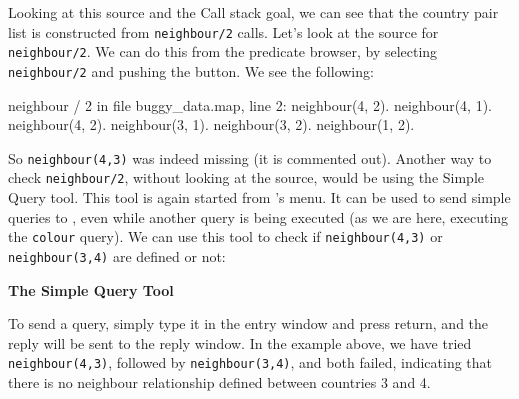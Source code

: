 Looking at this source and the Call stack goal, we can see that the country
pair list is constructed from \verb'neighbour/2' calls. Let's look at the
source for \verb'neighbour/2'. We can do this from the predicate browser, by
selecting \verb'neighbour/2' and pushing the  button. We see
the following:

\begin{code}
neighbour / 2 in file buggy_data.map, line 2:
neighbour(4, 2).
neighbour(4, 1).
neighbour(4, 2).
neighbour(3, 1).
neighbour(3, 2).
neighbour(1, 2).
\end{code}


So \verb'neighbour(4,3)' was indeed missing (it is commented out).
Another way to check \verb'neighbour/2', without looking at the source,
would be using the
Simple Query tool. This tool is again started from {\tkeclipse}'s
 menu. It can be used to send simple queries to {\eclipse},
even while another query is being executed (as we are here, executing the
\verb'colour' query). We can use this tool to check if \verb'neighbour(4,3)'
or \verb'neighbour(3,4)' are defined or not:

\begin{center}

\vspace{3mm}
{\bf The Simple Query Tool}
\end{center}

To send a query, simply type it in the entry window and press return, and
the reply will be sent to the reply window. In the example above, we have
tried \verb'neighbour(4,3)', followed by \verb'neighbour(3,4)', and
both failed, indicating that there is no neighbour relationship defined
between countries 3 and 4.

